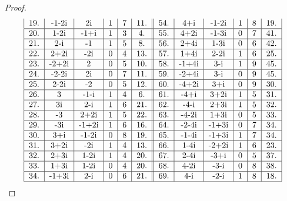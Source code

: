 \documentclass[czech,bachelor,dept470,male]{diploma}
\begin{document}
\begin{proof}
\begin{equation*}
\begin{tabular}{|c|c|c|c|c|c||c|c|c|c|c|c|}
			19. & -1-2i & 2i        & 1         & 7         & 11.  & 54. & 4+i   & -1-2i     & 1         & 8         & 19.  \\\hline
			20. & 1-2i  & -1+i      & 1         & 3         & 4.   & 55. & 4+2i  & -1-3i     & 0         & 7         & 41.  \\\hline
			21. & 2-i   & -1        & 1         & 5         & 8.   & 56. & 2+4i  & 1-3i      & 0         & 6         & 42.  \\\hline
			22. & 2+2i  & -2i       & 0         & 4         & 13.  & 57. & 1+4i  & 2-2i      & 1         & 6         & 25.  \\\hline
			23. & -2+2i & 2         & 0         & 5         & 10.  & 58. & -1+4i & 3-i       & 1         & 9         & 45.  \\\hline
			24. & -2-2i & 2i        & 0         & 7         & 11.  & 59. & -2+4i & 3-i       & 0         & 9         & 45.  \\\hline
			25. & 2-2i  & -2        & 0         & 5         & 12.  & 60. & -4+2i & 3+i       & 0         & 9         & 30.  \\\hline
			26. & 3     & -1-i      & 1         & 4         & 6.   & 61. & -4+i  & 3+2i      & 1         & 5         & 31.  \\\hline
			27. & 3i    & 2-i       & 1         & 6         & 21.  & 62. & -4-i  & 2+3i      & 1         & 5         & 32.  \\\hline
			28. & -3    & 2+2i      & 1         & 5         & 22.  & 63. & -4-2i & 1+3i      & 0         & 5         & 33.  \\\hline
			29. & -3i   & -1+2i     & 1         & 6         & 16.  & 64. & -2-4i & -1+3i     & 0         & 7         & 34.  \\\hline
			30. & 3+i   & -1-2i     & 0         & 8         & 19.  & 65. & -1-4i & -1+3i     & 1         & 7         & 34.  \\\hline
			31. & 3+2i  & -2i       & 1         & 4         & 13.  & 66. & 1-4i  & -2+2i     & 1         & 6         & 23.  \\\hline
			32. & 2+3i  & 1-2i      & 1         & 4         & 20.  & 67. & 2-4i  & -3+i      & 0         & 5         & 37.  \\\hline
			33. & 1+3i  & 1-2i      & 0         & 4         & 20.  & 68. & 4-2i  & -3-i      & 0         & 8         & 38.  \\\hline
			34. & -1+3i & 2-i       & 0         & 6         & 21.  & 69. & 4-i   & -2-i      & 1         & 8         & 18.  \\\hline

\end{tabular}
\end{equation*}
\end{proof}
\end{document}
